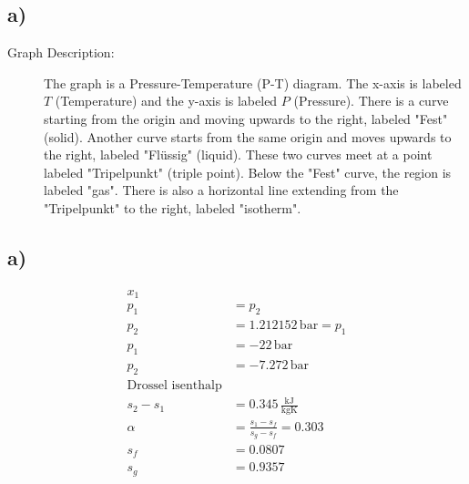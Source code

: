 

\subsection*{a)}

\begin{description}
    \item[Graph Description:] The graph is a Pressure-Temperature (P-T) diagram. The x-axis is labeled $T$ (Temperature) and the y-axis is labeled $P$ (Pressure). There is a curve starting from the origin and moving upwards to the right, labeled "Fest" (solid). Another curve starts from the same origin and moves upwards to the right, labeled "Flüssig" (liquid). These two curves meet at a point labeled "Tripelpunkt" (triple point). Below the "Fest" curve, the region is labeled "gas". There is also a horizontal line extending from the "Tripelpunkt" to the right, labeled "isotherm".
\end{description}



\subsection*{a)}
\begin{align*}
x_1 \\
p_1 &= p_2 \\
p_2 &= 1.212152 \, \text{bar} = p_1 \\
p_1 &= -22 \, \text{bar} \\
p_2 &= -7.272 \, \text{bar} \\
\text{Drossel isenthalp} \\
s_2 - s_1 &= 0.345 \, \frac{\text{kJ}}{\text{kgK}} \\
\alpha &= \frac{s_1 - s_f}{s_g - s_f} = 0.303 \\
s_f &= 0.0807 \\
s_g &= 0.9357
\end{align*}